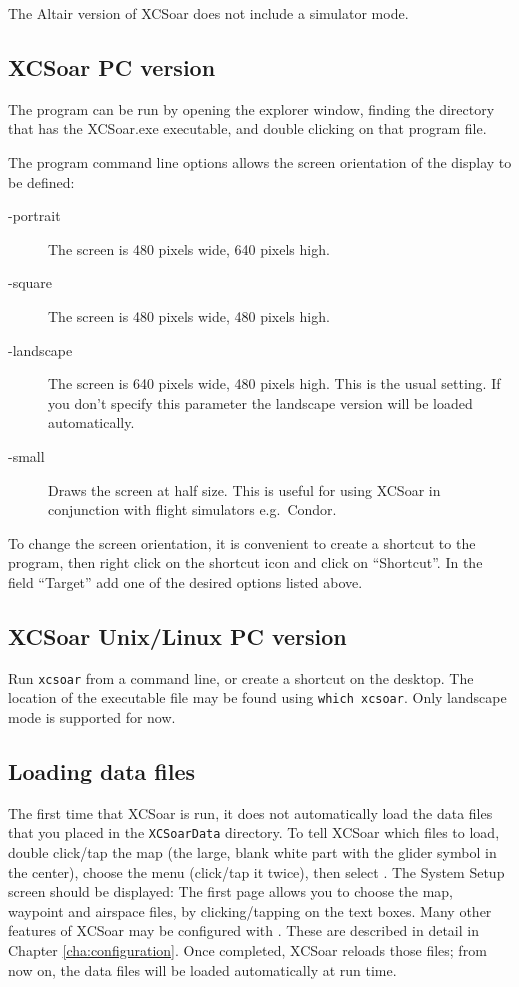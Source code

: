 The Altair version of XCSoar does not include a simulator mode.

\subsection*{XCSoar PC version}
The program can be run by opening the explorer window, finding the directory
that has the XCSoar.exe executable, and double clicking on that program file.

The program command line options allows the screen orientation of
the display to be defined:
\begin{description}
\item[-portrait] The screen is 480 pixels wide, 640 pixels high.
\item[-square] The screen is 480 pixels wide, 480 pixels high.
\item[-landscape] The screen is 640 pixels wide, 480 pixels high. This is the
usual setting. If you don't specify this parameter the landscape version will be
loaded automatically.
\item[-small] Draws the screen at half size.  This is useful for using XCSoar in
 conjunction with flight simulators e.g.\ Condor.
\end{description}
To change the screen orientation, it is convenient to create a shortcut to the
program, then right click on the shortcut icon and click on ``Shortcut''. 
In the field ``Target'' add one of the desired options listed above.

\subsection*{XCSoar Unix/Linux PC version}
Run \verb|xcsoar| from a command line, or create a shortcut on the
desktop.  The location of the executable file may be found using
\verb|which xcsoar|.  Only landscape mode is  supported for now.

\subsection*{Loading data files}
The first time that XCSoar is run, it does not automatically load the 
data files that you placed in the \verb|XCSoarData| directory.  
To tell XCSoar which files to load, double click/tap the map (the large,
blank white part with the glider symbol in the center),
choose the menu  (click/tap it twice), then select
.  The System Setup screen should be displayed:
The first page allows you to choose the map, 
waypoint and airspace files, by clicking/tapping on the text boxes.
Many other features of XCSoar may be configured with
. These are described in detail in Chapter
\ref{cha:configuration}.
Once completed, XCSoar reloads those files; from now on, the data files
will be loaded automatically at run time.

